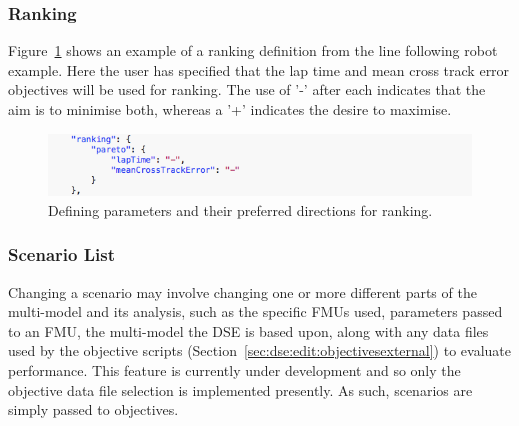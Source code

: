 \subsubsection{Ranking}\label{sec:dse:edit:ranking}

Figure~\ref{fig:dse:edit:ranking} shows an example of a ranking definition from the line following robot example.  Here the user has specified that the lap time and mean cross track error objectives will be used for ranking.  The use of '-' after each indicates that the aim is to minimise both, whereas a '+' indicates the desire to maximise.
%
%
%
\begin{figure}[ht]
	\centering
	\includegraphics[scale=0.55]{figures/dse/config-ranking}
	\caption{Defining parameters and their preferred directions for ranking.}\label{fig:dse:edit:ranking}
\end{figure}
%
%
%
\subsubsection{Scenario List}\label{sec:dse:edit:scenarios}
Changing a scenario may involve changing one or more different parts of the multi-model and its analysis, such as the specific FMUs used, parameters passed to an FMU, the multi-model the DSE is based upon, along with any data files used by the objective scripts (Section~\ref{sec:dse:edit:objectivesexternal}) to evaluate performance.  This feature is currently under development and so only the objective data file selection is implemented presently. As such, scenarios are simply passed to objectives.

